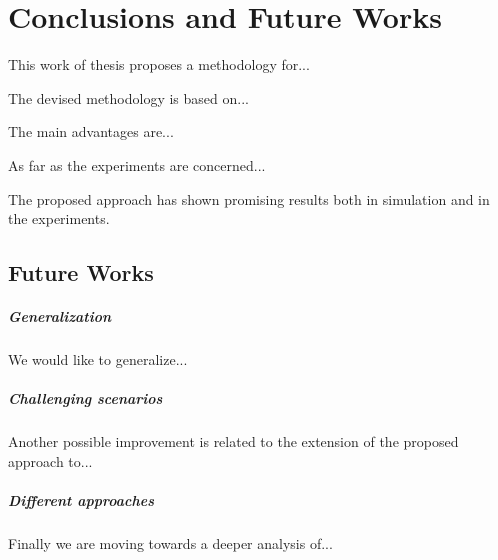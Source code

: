 \chapter{Conclusions and Future Works}
\label{chap:Conclusions}
\thispagestyle{empty}
\vspace{0.5cm}

\noindent

This work of thesis proposes a methodology for...

The devised methodology is based on...

The main advantages are...

As far as the experiments are concerned...

The proposed approach has shown promising results both in simulation and in the experiments.


\section{Future Works}

\paragraph{Generalization}
We would like to generalize...

\paragraph{Challenging scenarios}
Another possible improvement is related to the extension of the proposed approach to...

\paragraph{Different approaches}
Finally we are moving towards a deeper analysis of...